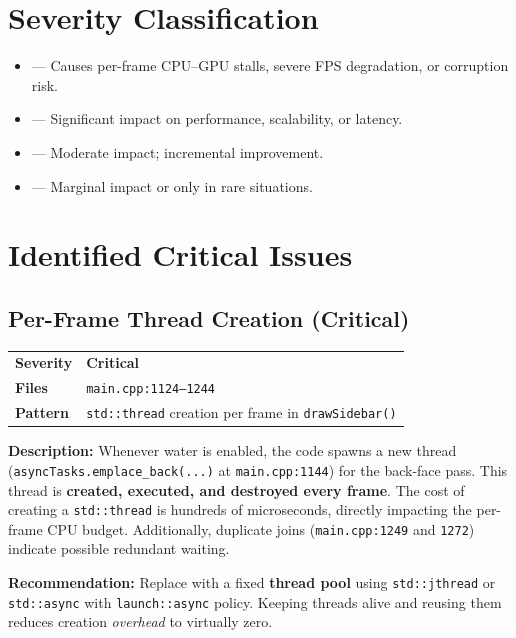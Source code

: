 \documentclass[a4paper,10pt]{article}
\newcommand{\severity}[1]{%
  \ifstrequal{#1}{Critical}{\textcolor{high}{\textbf{#1}}}{%
  \ifstrequal{#1}{High}{\textcolor{high}{\textbf{#1}}}{%
  \ifstrequal{#1}{Medium}{\textcolor{medium}{\textbf{#1}}}{%
  \ifstrequal{#1}{Low}{\textcolor{low}{\textbf{#1}}}{#1}}}}}
\begin{document}
\section{Severity Classification}

\begin{itemize}[nosep]
    \item[\textbf{Critical}] --- Causes per-frame CPU--GPU stalls, severe FPS degradation,
          or corruption risk.
    \item[\textbf{High}] --- Significant impact on performance, scalability, or latency.
    \item[\textbf{Medium}] --- Moderate impact; incremental improvement.
    \item[\textbf{Low}] --- Marginal impact or only in rare situations.
\end{itemize}

\section{Identified Critical Issues}

\subsection{Per-Frame Thread Creation (Critical)}

\begin{tabular}{ll}
    \textbf{Severity} & \severity{Critical} \\
    \textbf{Files}     & \texttt{main.cpp:1124--1244} \\
    \textbf{Pattern}   & \texttt{std::thread} creation per frame in
                          \texttt{drawSidebar()} \\
\end{tabular}

\vspace{0.5em}
\noindent
\textbf{Description:} Whenever water is enabled, the code spawns a new thread
(\texttt{asyncTasks.emplace\_back(...)} at \texttt{main.cpp:1144}) for the back-face
pass. This thread is \textbf{created, executed, and destroyed every frame}. The
cost of creating a \texttt{std::thread} is hundreds of microseconds,
directly impacting the per-frame CPU budget. Additionally, duplicate joins
(\texttt{main.cpp:1249} and \texttt{1272}) indicate possible redundant waiting.

\noindent\textbf{Recommendation:} Replace with a fixed \textbf{thread pool} using
\texttt{std::jthread} or \texttt{std::async} with \texttt{launch::async} policy.
Keeping threads alive and reusing them reduces creation \textit{overhead} to
virtually zero.
\end{document}
